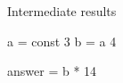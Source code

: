 





Intermediate results

\begin{code}
  a = const 3
  b = a 4
\end{code}


\begin{code}
answer = b * 14
\end{code}



